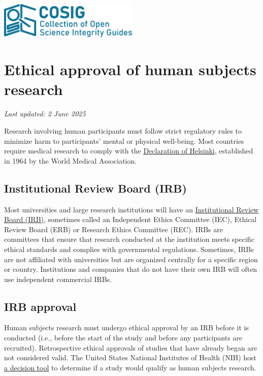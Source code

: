 \documentclass[letterpaper, 12pt]{article}
\begin{document}
\flushleft
\includegraphics[width=0.5\textwidth]{img/home/241017_final_logo_mockup.png}

\section*{Ethical approval of human subjects research}
\textit{Last updated: 2 June 2025}

Research involving human participants must follow strict regulatory rules to minimize harm to participants' mental or physical well-being. Most countries require medical research to comply with the \href{https://www.wma.net/policies-post/wma-declaration-of-helsinki/}{Declaration of Helsinki}, established in 1964 by the World Medical Association.

\subsection*{Institutional Review Board (IRB)}

Most universities and large research institutions will have an \href{https://en.wikipedia.org/wiki/Institutional_review_board#Exceptions}{Institutional Review Board (IRB)}, sometimes called an Independent Ethics Committee (IEC), Ethical Review Board (ERB) or Research Ethics Committee (REC). IRBs are committees that ensure that research conducted at the institution meets specific ethical standards and complies with governmental regulations. Sometimes, IRBs are not affiliated with universities but are organized centrally for a specific region or country. Institutions and companies that do not have their own IRB will often use independent commercial IRBs.

\subsection*{IRB approval}

Human subjects research must undergo ethical approval by an IRB before it is conducted (i.e., before the start of the study and before any participants are recruited). Retrospective ethical approvals of studies that have already began are not considered valid. The United States National Institutes of Health (NIH) host \href{https://grants.nih.gov/policy-and-compliance/policy-topics/human-subjects/hs-decision}{a decision tool} to determine if a study would qualify as human subjects research.
\end{document}
